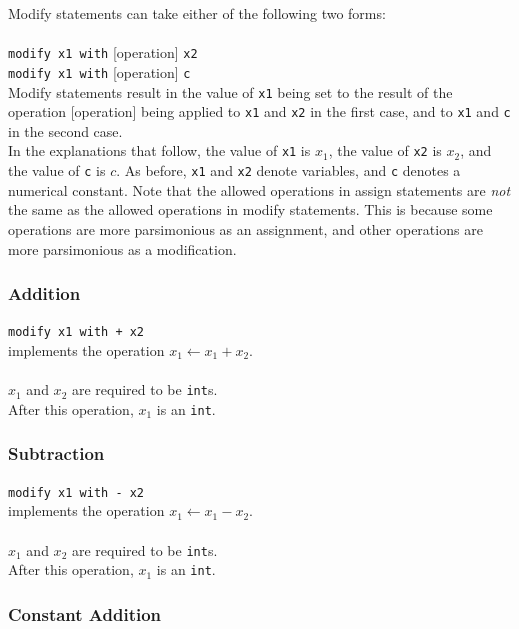 \documentclass{report}
\begin{document}
Modify statements can take either of the following two forms: \\ \\
\texttt{modify x1 with} [operation] \texttt{x2} \\ 
\texttt{modify x1 with} [operation] \texttt{c} \\

Modify statements result in the value of \texttt{x1} being set to the result of the operation [operation] being applied to \texttt{x1} and \texttt{x2} in the first case, and to \texttt{x1} and \texttt{c} in the second case. \\

In the explanations that follow, the value of \texttt{x1} is $x_1$, the value of \texttt{x2} is $x_2$, and the value of \texttt{c} is $c$. As before, \texttt{x1} and \texttt{x2} denote variables, and \texttt{c} denotes a numerical constant. Note that the allowed operations in assign statements are \emph{not} the same as the allowed operations in modify statements. This is because some operations are more parsimonious as an assignment, and other operations are more parsimonious as a modification.

\subsubsection{Addition}

\texttt{modify x1 with + x2} \\
implements the operation $x_1 \leftarrow x_1 + x_2$. \\ \\
$x_1$ and $x_2$ are required to be \texttt{int}s. \\
After this operation, $x_1$ is an \texttt{int}.

\subsubsection{Subtraction}

\texttt{modify x1 with - x2} \\
implements the operation $x_1 \leftarrow x_1 - x_2$. \\ \\
$x_1$ and $x_2$ are required to be \texttt{int}s. \\
After this operation, $x_1$ is an \texttt{int}.

\subsubsection{Constant Addition}
\end{document}
